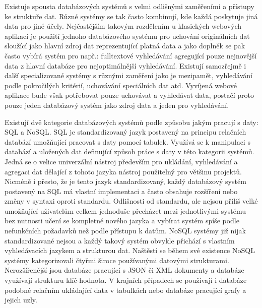 \begin{itemize}
\begin{itemize}
	Existuje spousta databázových systémů s velmi odlišnými zaměřeními a přístupy ke struktuře dat.
	Různé systémy se tak často kombinují, kde každá poskytuje jiná data pro jiné účely.
	Nejčastějším takovým rozdělením u klasických webových aplikací je použití jednoho databázového systému pro
	uchování originálních dat sloužící jako hlavní zdroj dat reprezentující platná data a jako doplněk se pak často vybírá
	systém pro např.: fulltextové vyhledávání agregující pouze nejnovější data z hlavní databáze pro nejoptimálnější vyhledávání.
	Existují samozřejmě i další specializované systémy s různými zaměření jako je mezipamět, vyhledávání podle pokročilých kritérií,
	uchovávání speciálních dat atd.
	Vyvíjená webové aplikace bude však potřebovat pouze uchovávat a vyhledávat data, postačí proto pouze jeden databázový systém
	jako zdroj data a jeden pro vyhledávání.

	Existují dvě kategorie databázových systémů podle způsobu jakým pracují s daty: \noindent\Ac{SQL} a \noindent\Ac{NoSQL}.
	\Ac{SQL} je standardizovaný jazyk postavený na principu relačních databází umožňující pracovat s daty pomocí tabulek.
	Využívá se k manipulaci s databází a uložených dat definující způsob práce s daty v této kategorii systémů.
	Jedná se o velice univerzální nástroj především pro ukládání, vyhledávání a agregaci dat dělající z tohoto jazyka
	nástroj použitelný pro většinu projektů.
	Nicméně i přesto, že je tento jazyk standardizovaný, každý databázový systém postavený na \Ac{SQL}
	má vlastní implementaci a často obsahuje rozšíření nebo změny v syntaxi oproti standardu. \cite{sql_intro}
	Odlišnosti od standardu, ale nejsou příliš velké umožňující uživatelům celkem jednoduše přecházet mezi jednotlivými
	systému bez nutnosti učení se kompletně nového jazyka a vybírat systém spíše podle nefunkčních požadavků než
	podle přístupu k datům.
	\Ac{NoSQL} systémy již nijak standardizované nejsou a každý takový systém obvykle přichází s vlastním
	vyhledávacích jazykem a strukturou dat.
	Naštěstí se během své existence \Ac{NoSQL} systémy kategorizovali čtyřmi široce používanými
	datovými strukturami.
	Nerozšířenější jsou databáze pracující s \noindent\Ac{JSON} či \Ac{XML} dokumenty a databáze využívají strukturu klíč-hodnota.
	V krajních případech se používají i databáze podobné relačním ukládající data v tabulkách nebo databáze pracující
	grafy a jejich uzly. \cite{nosql_explained}


\end{itemize}
\end{itemize}

